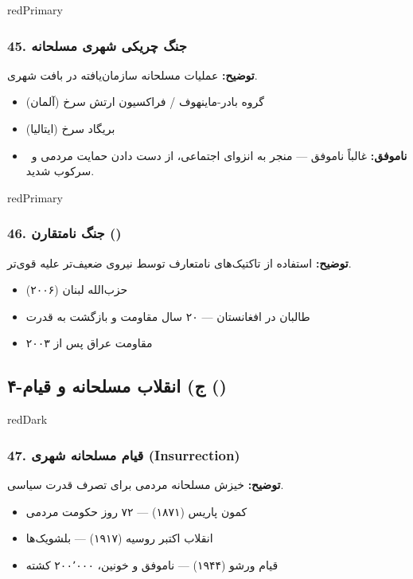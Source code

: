 \documentclass[a4paper,12pt]{article}
\newcommand{\failure}[1]{\textcolor{redPrimary}{\faTimesCircle\ \textbf{ناموفق:}} #1}
\newcommand{\methodnum}[1]{\textcolor{purpleLight}{\textbf{#1.}}}
\begin{document}
\begin{methodcard}{redPrimary}
\subsubsection{\methodnum{45} جنگ چریکی شهری مسلحانه}
\textbf{توضیح:} عملیات مسلحانه سازمان‌یافته در بافت شهری.

\begin{itemize}
  \item گروه بادر-ماینهوف / فراکسیون ارتش سرخ (آلمان)
  \item بریگاد سرخ (ایتالیا)
\end{itemize}
\begin{itemize}[label=\textcolor{redPrimary}{\faTimesCircle}]
  \item \failure{غالباً ناموفق — منجر به انزوای اجتماعی، از دست دادن حمایت مردمی و سرکوب شدید.}
\end{itemize}
\end{methodcard}

\begin{methodcard}{redPrimary}
\subsubsection{\methodnum{46} جنگ نامتقارن ()}
\textbf{توضیح:} استفاده از تاکتیک‌های نامتعارف توسط نیروی ضعیف‌تر علیه قوی‌تر.

\begin{itemize}
  \item حزب‌الله لبنان (۲۰۰۶)
  \item طالبان در افغانستان — ۲۰ سال مقاومت و بازگشت به قدرت
  \item مقاومت عراق پس از ۲۰۰۳
\end{itemize}
\end{methodcard}


\subsection{\textcolor{redDark}{\faCircle[regular]} ۴-ج) انقلاب مسلحانه و قیام ()}

\begin{methodcard}{redDark}
\subsubsection{\methodnum{47} قیام مسلحانه شهری (Insurrection)}
\textbf{توضیح:} خیزش مسلحانه مردمی برای تصرف قدرت سیاسی.

\begin{itemize}
  \item کمون پاریس (۱۸۷۱) — ۷۲ روز حکومت مردمی
  \item انقلاب اکتبر روسیه (۱۹۱۷) — بلشویک‌ها
  \item قیام ورشو (۱۹۴۴) — ناموفق و خونین، ۲۰۰٬۰۰۰ کشته
\end{itemize}
\end{methodcard}
\end{document}
